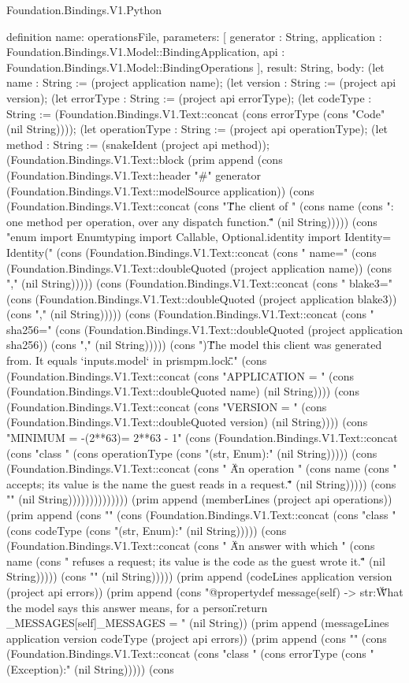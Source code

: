 \begin{lexlean}{Foundation.Bindings.V1.Python}
\begin{semanticmodule}
definition{
  name: operationsFile,
  parameters: [
    generator : String,
    application : Foundation.Bindings.V1.Model::BindingApplication,
    api : Foundation.Bindings.V1.Model::BindingOperations
  ],
  result: String,
  body: (let name : String := (project application name); (let version : String := (project api version); (let errorType : String := (project api errorType); (let codeType : String := (Foundation.Bindings.V1.Text::concat (cons errorType (cons "Code" (nil String)))); (let operationType : String := (project api operationType); (let method : String := (snakeIdent (project api method)); (Foundation.Bindings.V1.Text::block (prim append (cons (Foundation.Bindings.V1.Text::header "#" generator (Foundation.Bindings.V1.Text::modelSource application)) (cons (Foundation.Bindings.V1.Text::concat (cons "\"\"\"The client of " (cons name (cons ": one method per operation, over any dispatch function.\"\"\"" (nil String))))) (cons "\nfrom enum import Enum\nfrom typing import Callable, Optional\n\nfrom .identity import Identity\n\nMODEL = Identity(" (cons (Foundation.Bindings.V1.Text::concat (cons "    name=" (cons (Foundation.Bindings.V1.Text::doubleQuoted (project application name)) (cons "," (nil String))))) (cons (Foundation.Bindings.V1.Text::concat (cons "    blake3=" (cons (Foundation.Bindings.V1.Text::doubleQuoted (project application blake3)) (cons "," (nil String))))) (cons (Foundation.Bindings.V1.Text::concat (cons "    sha256=" (cons (Foundation.Bindings.V1.Text::doubleQuoted (project application sha256)) (cons "," (nil String))))) (cons ")\n\"\"\"The model this client was generated from. It equals `inputs.model` in prismpm.lock.\"\"\"\n" (cons (Foundation.Bindings.V1.Text::concat (cons "APPLICATION = " (cons (Foundation.Bindings.V1.Text::doubleQuoted name) (nil String)))) (cons (Foundation.Bindings.V1.Text::concat (cons "VERSION = " (cons (Foundation.Bindings.V1.Text::doubleQuoted version) (nil String)))) (cons "MINIMUM = -(2**63)\nMAXIMUM = 2**63 - 1\n\n" (cons (Foundation.Bindings.V1.Text::concat (cons "class " (cons operationType (cons "(str, Enum):" (nil String))))) (cons (Foundation.Bindings.V1.Text::concat (cons "    \"\"\"An operation " (cons name (cons " accepts; its value is the name the guest reads in a request.\"\"\"" (nil String))))) (cons "" (nil String)))))))))))))) (prim append (memberLines (project api operations)) (prim append (cons "\n" (cons (Foundation.Bindings.V1.Text::concat (cons "class " (cons codeType (cons "(str, Enum):" (nil String))))) (cons (Foundation.Bindings.V1.Text::concat (cons "    \"\"\"An answer with which " (cons name (cons " refuses a request; its value is the code as the guest wrote it.\"\"\"" (nil String))))) (cons "" (nil String))))) (prim append (codeLines application version (project api errors)) (prim append (cons "\n    @property\n    def message(self) -> str:\n        \"\"\"What the model says this answer means, for a person.\"\"\"\n        return _MESSAGES[self]\n\n\n_MESSAGES = {" (nil String)) (prim append (messageLines application version codeType (project api errors)) (prim append (cons "}\n\n" (cons (Foundation.Bindings.V1.Text::concat (cons "class " (cons errorType (cons "(Exception):" (nil String))))) (cons }
\end{semanticmodule}
\end{lexlean}
